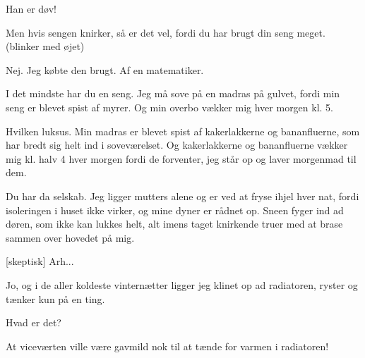 \documentclass[a4paper,11pt]{article}
\begin{document}
\begin{sketch}
 Han er døv!

 Men hvis sengen knirker, så er det vel, fordi du har brugt din seng meget. (blinker med øjet)

 Nej. Jeg købte den brugt. Af en matematiker.

 I det mindste har du en seng. Jeg må sove på en madras på gulvet, fordi min seng er blevet spist af myrer. Og min overbo vækker mig hver morgen kl. 5.

 Hvilken luksus. Min madras er blevet spist af kakerlakkerne og bananfluerne, som har bredt sig helt ind i soveværelset. Og kakerlakkerne og bananfluerne vækker mig kl. halv 4 hver morgen fordi de forventer, jeg står op og laver morgenmad til dem.

 Du har da selskab. Jeg ligger mutters alene og er ved at fryse ihjel hver nat, fordi isoleringen i huset ikke virker, og mine dyner er rådnet op. Sneen fyger ind ad døren, som ikke kan lukkes helt, alt imens taget knirkende truer med at brase sammen over hovedet på mig.

[skeptisk] Arh...

 Jo, og i de aller koldeste vinternætter ligger jeg klinet op ad radiatoren, ryster og tænker kun på en ting.

 Hvad er det?

 At viceværten ville være gavmild nok til at tænde for varmen i radiatoren!

\end{sketch}
\end{document}
